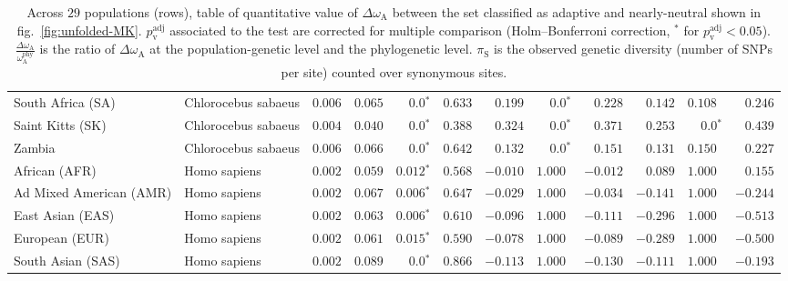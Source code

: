 \documentclass{article}
\newcommand{\rateApop}{\omega_{\mathrm{A}}}
\newcommand{\rateAphy}{\rateApop^{\mathrm{phy}}}
\begin{document}
\begin{table*}[tb]
\begin{adjustbox}{width = 0.95\textwidth}
\begin{tabular}{||l|l|r||r|r|r||r|r|r||r|r|r||}
                \rowcolor{LIGHTGREY} South Africa (SA)              & Chlorocebus sabaeus & $ 0.006$ & $ 0.065$ & $\bm{0.0{^*}}$                  & $ 0.633$                                                                     & $ 0.199$ & $\bm{0.0{^*}}$ & $ 0.228$ & $ 0.142$ & $ 0.108~~$ & $ 0.246$ \\
                \rowcolor{LIGHTGREY} Saint Kitts (SK)               & Chlorocebus sabaeus & $ 0.004$ & $ 0.040$ & $\bm{0.0{^*}}$                  & $ 0.388$                                                                     & $ 0.324$ & $\bm{0.0{^*}}$ & $ 0.371$ & $ 0.253$ & $\bm{0.0{^*}}$ & $ 0.439$ \\
                \rowcolor{LIGHTGREY} Zambia                         & Chlorocebus sabaeus & $ 0.006$ & $ 0.066$ & $\bm{0.0{^*}}$                  & $ 0.642$                                                                     & $ 0.132$                      & $\bm{0.0{^*}}$ & $ 0.151$ & $ 0.131$ & $ 0.150~~$ & $ 0.227$ \\
                African (AFR)                                       & Homo sapiens        & $ 0.002$ & $ 0.059$ & $\bm{ 0.012{^*}}$ & $ 0.568$ & $-0.010$ & $ 1.000~~$ & $-0.012$ & $ 0.089$ & $ 1.000~~$ & $ 0.155$ \\
                Ad Mixed American (AMR)                             & Homo sapiens        & $ 0.002$ & $ 0.067$ & $\bm{ 0.006{^*}}$ & $ 0.647$ & $-0.029$ & $ 1.000~~$ & $-0.034$ & $-0.141$ & $ 1.000~~$ & $-0.244$ \\
                East Asian (EAS)                                    & Homo sapiens        & $ 0.002$ & $ 0.063$ & $\bm{ 0.006{^*}}$ & $ 0.610$ & $-0.096$ & $ 1.000~~$ & $-0.111$ & $-0.296$ & $ 1.000~~$ & $-0.513$ \\
                European (EUR)                                      & Homo sapiens        & $ 0.002$ & $ 0.061$ & $\bm{ 0.015{^*}}$ & $ 0.590$ & $-0.078$ & $ 1.000~~$ & $-0.089$ & $-0.289$ & $ 1.000~~$ & $-0.500$ \\
                South Asian (SAS)                                   & Homo sapiens        & $ 0.002$ & $ 0.089$ & $\bm{0.0{^*}}$    & $ 0.866$ & $-0.113$ & $ 1.000~~$ & $-0.130$ & $-0.111$ & $ 1.000~~$ & $-0.193$ \\
                \bottomrule
            \end{tabular}
        \end{adjustbox}
        \caption{
            Across $29$ populations (rows), table of quantitative value of $\Delta \rateApop$ between the set classified as adaptive and nearly-neutral shown in fig.~\ref{fig:unfolded-MK}.
            $p_{\mathrm{v}}^{\mathrm{adj}}$ associated to the test are corrected for multiple comparison (Holm–Bonferroni correction, $^*$ for $p_{\mathrm{v}}^{\mathrm{adj}} < 0.05$).
            $\frac{\Delta\rateApop}{\rateAphy}$ is the ratio of $\Delta \rateApop$ at the population-genetic level and the phylogenetic level.
            $\pi_{\textrm{S}}$ is the observed genetic diversity (number of SNPs per site) counted over synonymous sites.
        }
        \label{table:unfolded-MK}
    \end{table*}
\end{document}
